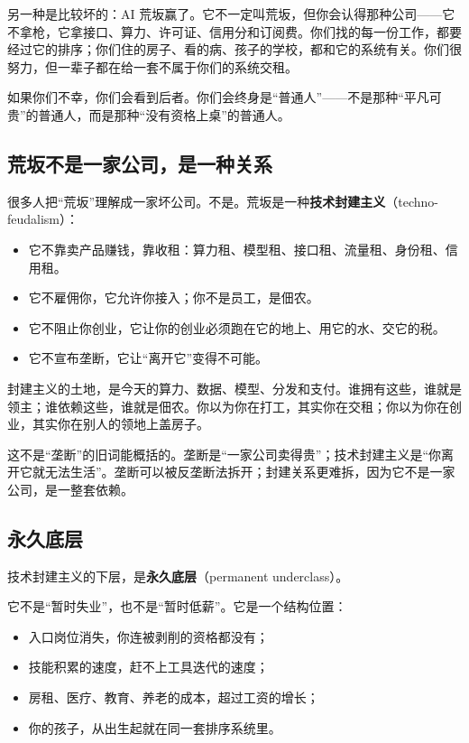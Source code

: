 另一种是比较坏的：AI
荒坂赢了。它不一定叫荒坂，但你会认得那种公司------它不拿枪，它拿接口、算力、许可证、信用分和订阅费。你们找的每一份工作，都要经过它的排序；你们住的房子、看的病、孩子的学校，都和它的系统有关。你们很努力，但一辈子都在给一套不属于你们的系统交租。

如果你们不幸，你们会看到后者。你们会终身是``普通人''------不是那种``平凡可贵''的普通人，而是那种``没有资格上桌''的普通人。

\subsection*{荒坂不是一家公司，是一种关系}\label{ux8352ux5742ux4e0dux662fux4e00ux5bb6ux516cux53f8ux662fux4e00ux79cdux5173ux7cfb}

很多人把``荒坂''理解成一家坏公司。不是。荒坂是一种\textbf{技术封建主义}（techno-feudalism）：

\begin{itemize}
\tightlist
\item
  它不靠卖产品赚钱，靠收租：算力租、模型租、接口租、流量租、身份租、信用租。
\item
  它不雇佣你，它允许你接入；你不是员工，是佃农。
\item
  它不阻止你创业，它让你的创业必须跑在它的地上、用它的水、交它的税。
\item
  它不宣布垄断，它让``离开它''变得不可能。
\end{itemize}

封建主义的土地，是今天的算力、数据、模型、分发和支付。谁拥有这些，谁就是领主；谁依赖这些，谁就是佃农。你以为你在打工，其实你在交租；你以为你在创业，其实你在别人的领地上盖房子。

这不是``垄断''的旧词能概括的。垄断是``一家公司卖得贵''；技术封建主义是``你离开它就无法生活''。垄断可以被反垄断法拆开；封建关系更难拆，因为它不是一家公司，是一整套依赖。

\subsection*{永久底层}\label{ux6c38ux4e45ux5e95ux5c42}

技术封建主义的下层，是\textbf{永久底层}（permanent underclass）。

它不是``暂时失业''，也不是``暂时低薪''。它是一个结构位置：

\begin{itemize}
\tightlist
\item
  入口岗位消失，你连被剥削的资格都没有；
\item
  技能积累的速度，赶不上工具迭代的速度；
\item
  房租、医疗、教育、养老的成本，超过工资的增长；
\item
  你的孩子，从出生起就在同一套排序系统里。
\end{itemize}

